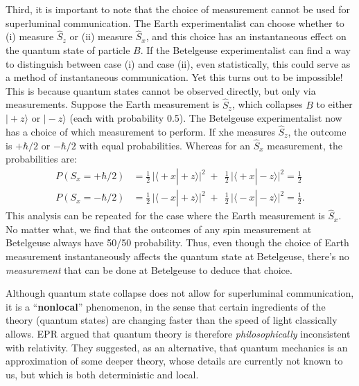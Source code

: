 \documentclass[pra,11pt]{revtex4}
\begin{document}
Third, it is important to note that the choice of measurement cannot
be used for superluminal communication.  The Earth experimentalist can
choose whether to (i) measure $\hat{S}_z$ or (ii) measure $\hat{S}_x$,
and this choice has an instantaneous effect on the quantum state of
particle $B$.  If the Betelgeuse experimentalist can find a way to
distinguish between case (i) and case (ii), even statistically, this
could serve as a method of instantaneous communication.  Yet this
turns out to be impossible!  This is because quantum states cannot be
observed directly, but only via measurements.  Suppose the Earth
measurement is $\hat{S}_z$, which collapses $B$ to either
$|\!+\!z\rangle$ or $|\!-\!z\rangle$ (each with probability
0.5).  The Betelgeuse experimentalist now has a choice of which
measurement to perform.  If xhe measures $\hat{S}_z$, the outcome is
$+\hbar/2$ or $-\hbar/2$ with equal probabilities.  Whereas for an
$\hat{S}_x$ measurement, the probabilities are:
$$\begin{aligned}P(S_x = +\hbar/2) &= \frac{1}{2}\, \Big|\langle\!+x|\!+\!z\rangle\Big|^2 \;+\;\, \frac{1}{2}\, \Big|\langle\!+x|\!-\!z\rangle\Big|^2 = \frac{1}{2}\\P(S_x = -\hbar/2) &= \frac{1}{2}\, \Big|\langle\!-x|\!+\!z\rangle\Big|^2 \;+\;\, \frac{1}{2}\, \Big|\langle\!-x|\!-\!z\rangle\Big|^2 = \frac{1}{2}.\end{aligned}$$
This analysis can be repeated for the case where the Earth measurement
is $\hat{S}_x$.  No matter what, we find that the outcomes of any spin
measurement at Betelgeuse always have 50/50 probability.  Thus, even
though the choice of Earth measurement instantaneously affects the
quantum state at Betelgeuse, there's no \textit{measurement} that can
be done at Betelgeuse to deduce that choice.

Although quantum state collapse does not allow for superluminal
communication, it is a ``\textbf{nonlocal}'' phenomenon, in the sense
that certain ingredients of the theory (quantum states) are changing
faster than the speed of light classically allows.  EPR argued that
quantum theory is therefore \textit{philosophically} inconsistent with
relativity.  They suggested, as an alternative, that quantum mechanics
is an approximation of some deeper theory, whose details are currently
not known to us, but which is both deterministic and local.
\end{document}
